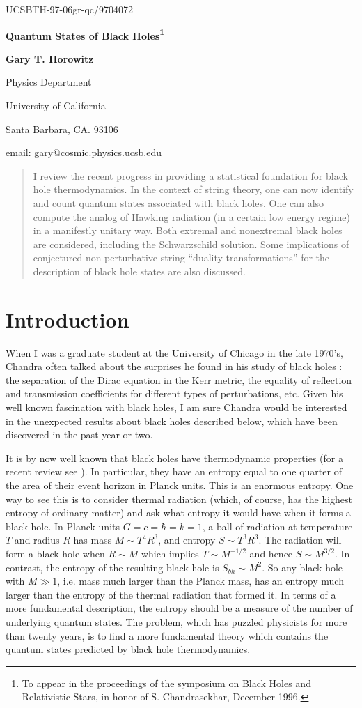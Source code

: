 \documentclass[12pt]{article}
\newcommand{\sect}[1]{\section{#1}\setcounter{equation}{0}}
\begin{document}
\bigskip
\hskip 3.7in\vbox{\baselineskip12pt
\hbox{UCSBTH-97-06}\hbox{gr-qc/9704072}}
\bigskip\bigskip\bigskip

\centerline{\large \bf Quantum States of Black Holes\footnote{To appear
in the proceedings of the symposium on Black Holes and Relativistic Stars,
in honor of S. Chandrasekhar, December 1996.}}

\bigskip\bigskip


\centerline{\bf Gary T. Horowitz}
\medskip
\centerline{Physics Department}
\centerline{University of California}
\centerline{Santa Barbara, CA. 93106}
\medskip
\centerline{email: gary@cosmic.physics.ucsb.edu}

\begin{abstract}
\baselineskip=16pt
I review the recent progress in providing a statistical foundation
for black hole thermodynamics. In the context of string theory, one
can now identify and count quantum states associated with black holes.
One can also compute the analog of Hawking radiation (in a certain
low energy regime) in a manifestly
unitary way. Both extremal and nonextremal black holes
are considered, including the Schwarzschild solution.
Some implications of conjectured non-perturbative
 string ``duality transformations''
for the description of black hole states are also discussed.
\end{abstract}
\newpage
\baselineskip=16pt

\sect{Introduction}

When I was a graduate student at the University of Chicago in the
late 1970's, Chandra often talked about the surprises he found in
his study of black holes \cite{chan}: the separation of the Dirac equation in
the Kerr metric, the equality of reflection and transmission
coefficients for different types of perturbations, etc. 
Given his well known fascination 
with black holes, I am sure Chandra would be interested in
the unexpected results about black holes described below,
which have been discovered in
the past year or two.

It is by now well known that black holes have
thermodynamic properties (for a recent
review see \cite{wald}). In particular, they have 
an entropy equal to one quarter of the area of their event horizon 
in Planck units.
This is an enormous entropy. One way to see this is to consider
thermal radiation (which, of course, has the highest entropy of ordinary matter)
and ask what entropy it would have when it forms a black hole. In
Planck units $G=c=\hbar=k=1$, a ball of radiation
at temperature $T$ and radius $R$ has mass $M\sim T^4 R^3$, and entropy
 $S\sim T^3 R^3$.
The radiation will form a black hole when $R\sim M$  which implies
$T \sim M^{-1/2}$ and hence $S\sim M^{3/2}$. In contrast, the entropy
of the resulting black hole is $S_{bh}\sim M^2$. So any black hole with
$M\gg 1$, i.e. mass much larger than the Planck mass, has an entropy
much larger than the entropy of the thermal radiation that formed it.
In terms of a more fundamental description, the entropy should be a measure
of the number of underlying 
quantum states. 
The problem, which has puzzled physicists for more than twenty years,
is to find a more fundamental theory which contains 
 the quantum states predicted by black hole thermodynamics.
\end{document}
